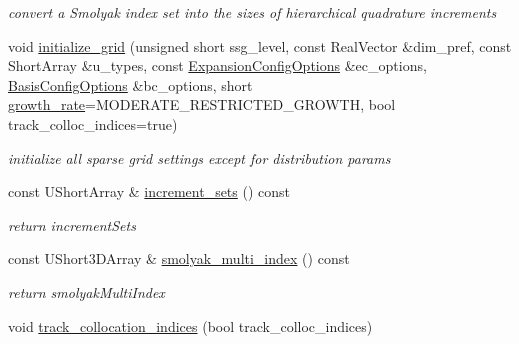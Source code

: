\begin{DoxyCompactItemize}
\begin{DoxyCompactList}\small\item\em convert a Smolyak index set into the sizes of hierarchical quadrature increments \end{DoxyCompactList}\item 
void \hyperlink{classPecos_1_1HierarchSparseGridDriver_a83a702e16bb1f910c689b0778f242588}{initialize\+\_\+grid} (unsigned short ssg\+\_\+level, const Real\+Vector \&dim\+\_\+pref, const Short\+Array \&u\+\_\+types, const \hyperlink{classPecos_1_1ExpansionConfigOptions}{Expansion\+Config\+Options} \&ec\+\_\+options, \hyperlink{classPecos_1_1BasisConfigOptions}{Basis\+Config\+Options} \&bc\+\_\+options, short \hyperlink{classPecos_1_1SparseGridDriver_a6f9061513ba25c62ee7a49b0d5da42cc}{growth\+\_\+rate}=M\+O\+D\+E\+R\+A\+T\+E\+\_\+\+R\+E\+S\+T\+R\+I\+C\+T\+E\+D\+\_\+\+G\+R\+O\+W\+TH, bool track\+\_\+colloc\+\_\+indices=true)\label{classPecos_1_1HierarchSparseGridDriver_a83a702e16bb1f910c689b0778f242588}

\begin{DoxyCompactList}\small\item\em initialize all sparse grid settings except for distribution params \end{DoxyCompactList}\item 
const U\+Short\+Array \& \hyperlink{classPecos_1_1HierarchSparseGridDriver_a519ca966ef4e784c01698731201e042a}{increment\+\_\+sets} () const \label{classPecos_1_1HierarchSparseGridDriver_a519ca966ef4e784c01698731201e042a}

\begin{DoxyCompactList}\small\item\em return increment\+Sets \end{DoxyCompactList}\item 
const U\+Short3\+D\+Array \& \hyperlink{classPecos_1_1HierarchSparseGridDriver_a319b6d1acf6169cf597ebfd6aca3dd08}{smolyak\+\_\+multi\+\_\+index} () const \label{classPecos_1_1HierarchSparseGridDriver_a319b6d1acf6169cf597ebfd6aca3dd08}

\begin{DoxyCompactList}\small\item\em return smolyak\+Multi\+Index \end{DoxyCompactList}\item 
void \hyperlink{classPecos_1_1HierarchSparseGridDriver_a2dd6028a82c1ac53ec629162e9edfea0}{track\+\_\+collocation\+\_\+indices} (bool track\+\_\+colloc\+\_\+indices)\label{classPecos_1_1HierarchSparseGridDriver_a2dd6028a82c1ac53ec629162e9edfea0}


\end{DoxyCompactItemize}
